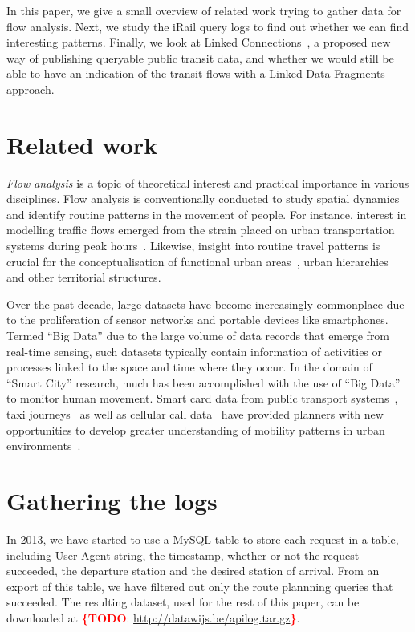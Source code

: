 \documentclass{sig-alternate}
\newcommand{\todo}[1]{\noindent\textcolor{red}{{\bf \{TODO}: #1{\bf \}}}}
\begin{document}
In this paper, we give a small overview of related work trying to gather data for flow analysis.
Next, we study the iRail query logs to find out whether we can find interesting patterns.
Finally, we look at Linked Connections~\cite{lc}, a proposed new way of publishing queryable public transit data, and whether we would still be able to have an indication of the transit flows with a Linked Data Fragments~\cite{ldf} approach.

\section{Related work}
\label{sec:relwork}

\emph{Flow analysis} is a topic of theoretical interest and practical importance in various disciplines. 
Flow analysis is conventionally conducted to study spatial dynamics and identify routine patterns in the movement of people.
For instance, interest in modelling traffic flows emerged from the strain placed on urban transportation systems during peak hours~\cite{roth,ferreira}.
Likewise, insight into routine travel patterns is crucial for the conceptualisation of functional urban areas~\cite{servillo,sykora}, urban hierarchies~\cite{christaller} and other territorial structures.

Over the past decade, large datasets have become increasingly commonplace due to the proliferation of sensor networks and portable devices like smartphones.
Termed ``Big Data'' due to the large volume of data records that emerge from real-time sensing\cite{kitchin}, such datasets typically contain information of activities or processes linked to the space and time where they occur.
In the domain of ``Smart City'' research, much has been accomplished with the use of ``Big Data'' to monitor human movement.
Smart card data from public transport systems~\cite{roth,beecham}, taxi journeys~\cite{ferreira} as well as cellular call data~\cite{sevtsuk} have provided planners with new opportunities to develop greater understanding of mobility patterns in urban environments~\cite{batty}.

\section{Gathering the logs}
\label{sec:logs}

In 2013, we have started to use a MySQL table to store each request in a table, including User-Agent string, the timestamp, whether or not the request succeeded, the departure station and the desired station of arrival.
From an export of this table, we have filtered out only the route plannning queries that succeeded.
The resulting dataset, used for the rest of this paper, can be downloaded at \todo{\url{http://datawijs.be/apilog.tar.gz}}.
\end{document}
